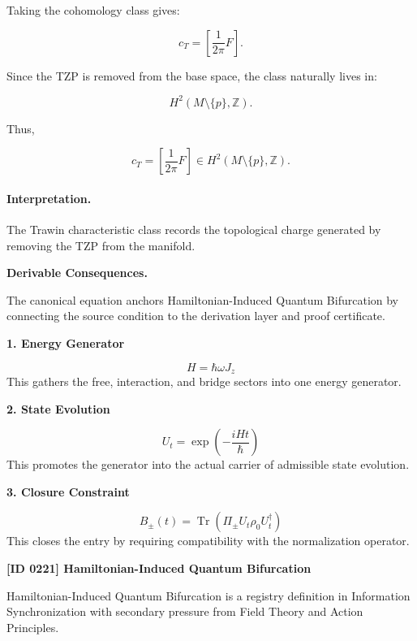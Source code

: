 Taking the cohomology class gives:

\begin{equation}
c_T
=
\left[
\frac{1}{2\pi}F
\right].
\end{equation}

Since the TZP is removed from the base space, the class naturally lives in:

\begin{equation}
H^2(M\setminus\{p\},\mathbb{Z}) .
\end{equation}

Thus,

\begin{equation}
\boxed{
c_T
=
\left[
\frac{1}{2\pi}F
\right]
\in
H^2(M\setminus\{p\},\mathbb{Z}) .
}
\end{equation}

\paragraph{Interpretation.}
The Trawin characteristic class records the topological charge generated by removing the TZP from the manifold.

\par\vspace{0.35em}
\noindent\textbf{Derivable Consequences.}\quad
\begingroup
\footnotesize
\raggedright
The canonical equation anchors Hamiltonian-Induced Quantum Bifurcation by connecting the source condition to the derivation layer and proof certificate.
\par\endgroup

\noindent\textbf{1. Energy Generator}\par
\[
H=\hbar\omega J_z
\]
\noindent This gathers the free, interaction, and bridge sectors into one energy generator.\par
\noindent\textbf{2. State Evolution}\par
\[
U_t=\exp\left(-\frac{iHt}{\hbar}\right)
\]
\noindent This promotes the generator into the actual carrier of admissible state evolution.\par
\noindent\textbf{3. Closure Constraint}\par
\[
B_{\pm}(t)=\operatorname{Tr}\!\left(\Pi_{\pm}U_t\rho_0U_t^{\dagger}\right)
\]
\noindent This closes the entry by requiring compatibility with the normalization operator.\par

\clearpage
\noindent\textbf{[ID 0221] Hamiltonian-Induced Quantum Bifurcation}\par
\vspace{0.35em}
\begingroup\small
{}
Hamiltonian-Induced Quantum Bifurcation is a registry definition in Information Synchronization with secondary pressure from Field Theory and Action Principles.

